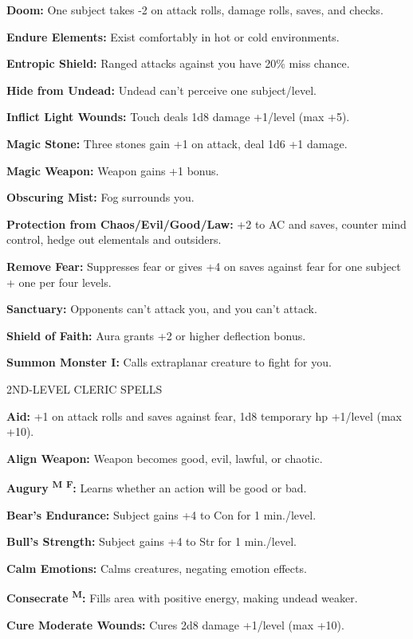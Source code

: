 \documentclass{article}
\begin{document}
\textbf{Doom:} One subject takes -2 on attack rolls, damage rolls, saves, and checks.

\textbf{Endure Elements:} Exist comfortably in hot or cold environments.

\textbf{Entropic Shield:} Ranged attacks against you have 20\% miss chance.

\textbf{Hide from Undead:} Undead can't perceive one subject/level.

\textbf{Inflict Light Wounds: }Touch deals 1d8 damage +1/level (max +5).

\textbf{Magic Stone:} Three stones gain +1 on attack, deal 1d6 +1 damage.

\textbf{Magic Weapon: }Weapon gains +1 bonus.

\textbf{Obscuring Mist:} Fog surrounds you.

\textbf{Protection from Chaos/Evil/Good/Law:} +2 to AC and saves, counter mind 
control, hedge out elementals and outsiders.

\textbf{Remove Fear:} Suppresses fear or gives +4 on saves against fear for one 
subject + one per four levels.

\textbf{Sanctuary:} Opponents can't attack you, and you can't attack.

\textbf{Shield of Faith:} Aura grants +2 or higher deflection bonus.

\textbf{Summon Monster I:} Calls extraplanar creature to fight for you.

2ND-LEVEL CLERIC SPELLS

\textbf{Aid:} +1 on attack rolls and saves against fear, 1d8 temporary hp +1/level 
(max +10).

\textbf{Align Weapon: }Weapon becomes good, evil, lawful, or chaotic.

\textbf{Augury }\textsuperscript{\textbf{M}}{\scriptsize{}\textbf{ }}\textsuperscript{\textbf{F}}\textbf{:} 
Learns whether an action will be good or bad.

\textbf{Bear's Endurance:} Subject gains +4 to Con for 1 min./level.

\textbf{Bull's Strength:} Subject gains +4 to Str for 1 min./level.

\textbf{Calm Emotions:} Calms creatures, negating emotion effects.

\textbf{Consecrate }\textsuperscript{\textbf{M}}\textbf{:} Fills area with positive 
energy, making undead weaker.

\textbf{Cure Moderate Wounds:} Cures 2d8 damage +1/level (max +10).
\end{document}
